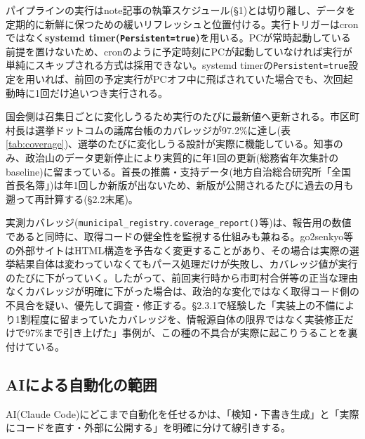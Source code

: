 \documentclass[a4paper,11pt]{ltjsarticle}
\begin{document}
パイプラインの実行はnote記事の執筆スケジュール(\S1)とは切り離し、データを定期的に新鮮に保つための緩いリフレッシュと位置付ける。実行トリガーはcronではなく\textbf{systemd timer(\texttt{Persistent=true})}を用いる。PCが常時起動している前提を置けないため、cronのように予定時刻にPCが起動していなければ実行が単純にスキップされる方式は採用できない。systemd timerの\texttt{Persistent=true}設定を用いれば、前回の予定実行がPCオフ中に飛ばされていた場合でも、次回起動時に1回だけ追いつき実行される。

国会側は召集日ごとに変化しうるため実行のたびに最新値へ更新される。市区町村長は選挙ドットコムの議席台帳のカバレッジが97.2\%に達し(表\ref{tab:coverage})、選挙のたびに変化しうる設計が実際に機能している。知事のみ、政治山のデータ更新停止により実質的に年1回の更新(総務省年次集計のbaseline)に留まっている。首長の推薦・支持データ(地方自治総合研究所「全国首長名簿」)は年1回しか新版が出ないため、新版が公開されるたびに過去の月も遡って再計算する(\S2.2末尾)。

実測カバレッジ(\texttt{municipal\_registry.coverage\_report()}等)は、報告用の数値であると同時に、取得コードの健全性を監視する仕組みも兼ねる。go2senkyo等の外部サイトはHTML構造を予告なく変更することがあり、その場合は実際の選挙結果自体は変わっていなくてもパース処理だけが失敗し、カバレッジ値が実行のたびに下がっていく。したがって、前回実行時から市町村合併等の正当な理由なくカバレッジが明確に下がった場合は、政治的な変化ではなく取得コード側の不具合を疑い、優先して調査・修正する。\S2.3.1で経験した「実装上の不備により1割程度に留まっていたカバレッジを、情報源自体の限界ではなく実装修正だけで97\%まで引き上げた」事例が、この種の不具合が実際に起こりうることを裏付けている。

\subsection{AIによる自動化の範囲}
\label{sec:ai-automation-scope}

AI(Claude Code)にどこまで自動化を任せるかは、「検知・下書き生成」と「実際にコードを直す・外部に公開する」を明確に分けて線引きする。
\end{document}
